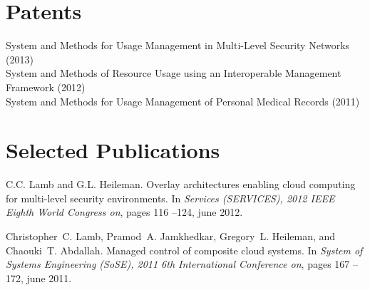 \documentclass[margin,line]{resume}
\begin{document}
\begin{resume}
\section{\mysidestyle Patents}
{\small System and Methods for Usage Management in Multi-Level Security Networks (2013)} \\
{\small System and Methods of Resource Usage using an Interoperable Management Framework (2012)} \\
{\small System and Methods for Usage Management of Personal Medical Records (2011)}

\section{\mysidestyle Selected Publications}
C.C. Lamb and G.L. Heileman.
\newblock Overlay architectures enabling cloud computing for multi-level
  security environments.
\newblock In {\em Services (SERVICES), 2012 IEEE Eighth World Congress on},
  pages 116 --124, june 2012.


Christopher~C. Lamb, Pramod~A. Jamkhedkar, Gregory~L. Heileman, and Chaouki~T.
  Abdallah.
\newblock Managed control of composite cloud systems.
\newblock In {\em System of Systems Engineering (SoSE), 2011 6th International
  Conference on}, pages 167 --172, june 2011.


\end{resume}
\end{document}
